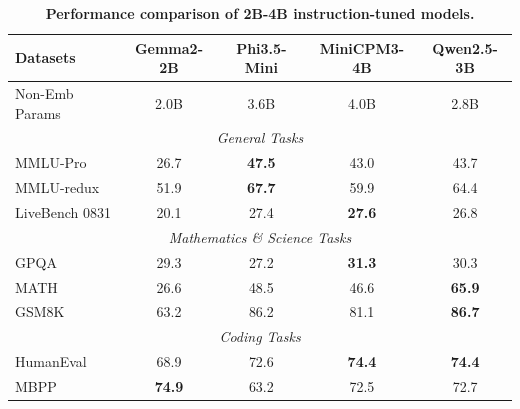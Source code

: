\begin{table}[t]

\centering

\caption{\textbf{Performance comparison of 2B-4B instruction-tuned models.}}

\label{tab:4b-instruct}
\small
\setlength{\tabcolsep}{2.6pt}

\begin{tabular}{@{}lcccc@{}}

\toprule

\textbf{Datasets} & \textbf{Gemma2-2B} & \textbf{Phi3.5-Mini} & \textbf{MiniCPM3-4B} & \textbf{Qwen2.5-3B} \\

\midrule

Non-Emb Params & 2.0B & 3.6B & 4.0B & 2.8B \\

\midrule

\multicolumn{5}{c}{\textit{General Tasks}} \\

\midrule

MMLU-Pro & 26.7 & \textbf{47.5} & 43.0 & 43.7 \\

MMLU-redux & 51.9 & \textbf{67.7} & 59.9 & 64.4 \\

LiveBench 0831 & 20.1 & 27.4 & \textbf{27.6} & 26.8 \\

\midrule

\multicolumn{5}{c}{\textit{Mathematics \& Science Tasks}} \\

\midrule

GPQA & 29.3 & 27.2 & \textbf{31.3} & 30.3 \\

MATH & 26.6 & 48.5 & 46.6 & \textbf{65.9} \\

GSM8K & 63.2 & 86.2 & 81.1 & \textbf{86.7} \\

\midrule

\multicolumn{5}{c}{\textit{Coding Tasks}} \\

\midrule

HumanEval & 68.9 & 72.6 & \textbf{74.4} & \textbf{74.4} \\

MBPP & \textbf{74.9} & 63.2 & 72.5 & 72.7 \\


\end{tabular}
\end{table}
